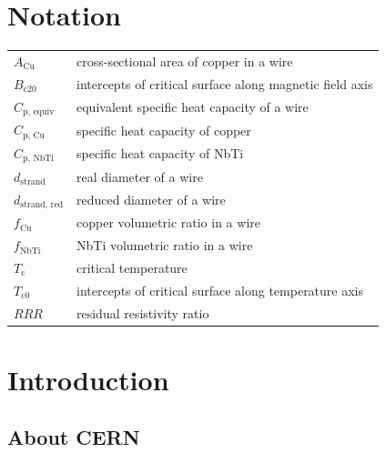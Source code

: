 \documentclass{article}
\begin{document}

\clearpage\thispagestyle{empty}
\tableofcontents
\clearpage\thispagestyle{empty}

\section*{Notation}

\begin{table}[h!]
    \vspace{-1.em} 
    \fontsize{10}{10}
    \selectfont 
    \renewcommand{\arraystretch}{1.5}
    \begin{center}
    \begin{tabular}{ l l }  
    \hline
    $A_\text{Cu}$ & cross-sectional area of copper in a wire \\  
    $B_\text{c20}$ & intercepts of critical surface along magnetic field axis \\  
    $C_\text{p, equiv}$ & equivalent specific heat capacity of a wire \\  
    $C_\text{p, Cu}$ & specific heat capacity of copper \\   
    $C_\text{p, NbTi}$ & specific heat capacity of NbTi \\  
    $d_\text{strand}$ & real diameter of a wire \\  
    $d_\text{strand, red}$ & reduced diameter of a wire \\   
    $f_\text{Cu}$ &  copper volumetric ratio in a wire\\        
    $f_\text{NbTi}$ &  NbTi volumetric ratio in a wire\\   
    $T_\text{c}$ & critical temperature \\
    $T_\text{c0}$ & intercepts of critical surface along temperature axis \\
    $RRR$ & residual resistivity ratio \\
    \hline
     \end{tabular} 
    \end{center}  
 \end{table}
\newpage

\pagestyle{fancy}
\section{Introduction}

\subsection{About CERN}
\end{document}
